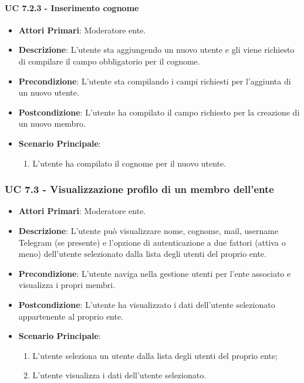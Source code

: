 			\paragraph{UC 7.2.3 - Inserimento cognome}
			\begin{itemize}
				\item \textbf{Attori Primari}: Moderatore ente.
				\item \textbf{Descrizione}: L'utente sta aggiungendo un nuovo utente e gli viene richiesto di compilare il campo obbligatorio per il cognome.
				\item \textbf{Precondizione}: L'utente sta compilando i campi richiesti per l'aggiunta di un nuovo utente.
				\item \textbf{Postcondizione}: L'utente ha compilato il campo richiesto per la creazione di un nuovo membro.
				\item \textbf{Scenario Principale}:
				\begin{enumerate}
					\item{L'utente ha compilato il cognome per il nuovo utente.}
				\end{enumerate}	
			\end{itemize}

			\subsubsection{UC 7.3 - Visualizzazione profilo di un membro dell'ente}
			\begin{itemize}
				\item \textbf{Attori Primari}: Moderatore ente.
				\item \textbf{Descrizione}: L'utente può visualizzare nome, cognome, mail, username Telegram (se presente) e l'opzione di autenticazione a due fattori (attiva o meno) dell'utente selezionato dalla lista degli utenti del proprio ente.
				\item \textbf{Precondizione}: L'utente naviga nella gestione utenti per l'ente associato e visualizza i propri membri.
				\item \textbf{Postcondizione}: L'utente ha visualizzato i dati dell'utente selezionato appartenente al proprio ente.
				\item \textbf{Scenario Principale}:
				\begin{enumerate}
					\item{L'utente seleziona un utente dalla lista degli utenti del proprio ente;}
					\item{L'utente visualizza i dati dell'utente selezionato.}
				\end{enumerate}
			\end{itemize}


